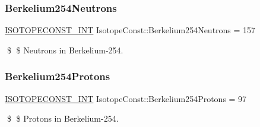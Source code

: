 \subsubsection{\texorpdfstring{Berkelium254\+Neutrons}{Berkelium254Neutrons}}
{\footnotesize\ttfamily \mbox{\hyperlink{group___isotope_const-_macros_ga5f18360b3e99483a35c32d789e62621c}{I\+S\+O\+T\+O\+P\+E\+C\+O\+N\+S\+T\+\_\+\+I\+NT}} Isotope\+Const\+::\+Berkelium254\+Neutrons = 157}

\$ \$ Neutrons in Berkelium-\/254. \mbox{\label{group___isotope_const-_berkelium-_bk254_gabe5121d4741c6dd45adfd8e52ca707ee}} 
\subsubsection{\texorpdfstring{Berkelium254\+Protons}{Berkelium254Protons}}
{\footnotesize\ttfamily \mbox{\hyperlink{group___isotope_const-_macros_ga5f18360b3e99483a35c32d789e62621c}{I\+S\+O\+T\+O\+P\+E\+C\+O\+N\+S\+T\+\_\+\+I\+NT}} Isotope\+Const\+::\+Berkelium254\+Protons = 97}

\$ \$ Protons in Berkelium-\/254. 